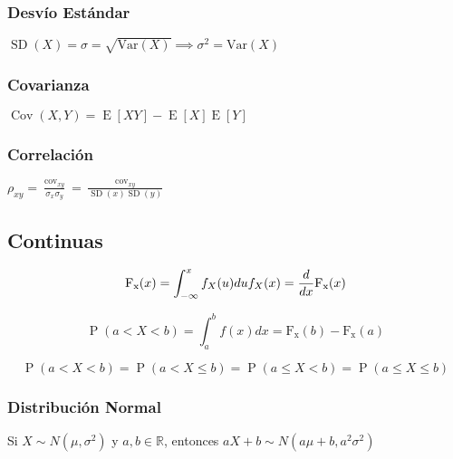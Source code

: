 \documentclass[
]{article}
\begin{document}
\hypertarget{desvuxedo-estuxe1ndar}{%
\subsubsection{Desvío Estándar}\label{desvuxedo-estuxe1ndar}}

\({\operatorname{SD}(X) = \sigma ={\sqrt {{\text{Var}}(X)}}} \implies{\sigma ^{2}={\text{Var}}(X)}\)

\hypertarget{covarianza}{%
\subsubsection{Covarianza}\label{covarianza}}

\({\operatorname {Cov} (X,Y)=\operatorname {E} \left[XY\right]-\operatorname {E} \left[X\right]\operatorname {E} \left[Y\right]}\)

\hypertarget{correlaciuxf3n}{%
\subsubsection{Correlación}\label{correlaciuxf3n}}

\(\rho_{xy} = {\frac{\operatorname{cov}_{xy}}{\sigma_x\sigma_y}} = {\frac{\operatorname{cov}_{xy}}{\operatorname{SD}(x)\operatorname{SD}(y)}}\)

\hypertarget{continuas}{%
\subsection{Continuas}\label{continuas}}

\[
{\operatorname{F_x}(x) = \int_{-\infty}^{x}{f_X(u)du}} \\
f_X(x) = \frac{d}{dx}{\operatorname{F_x}(x)} \\
\]

\[{\operatorname{P}(a < X < b) = \int_a^b{f(x)dx} = \operatorname{F_x}(b) -\operatorname{F_x}(a)} \]

\[{\operatorname{P}(a < X < b) = \operatorname{P}(a < X \leq b) = \operatorname{P}(a \leq X < b)= \operatorname{P}(a \leq X \leq b)}\]

\hypertarget{distribuciuxf3n-normal}{%
\subsubsection{Distribución Normal}\label{distribuciuxf3n-normal}}

Si \({X\sim N(\mu ,\sigma ^{2})}\) y \({a,b\in \mathbb {R} }\), entonces
\({aX+b\sim N(a\mu +b,a^{2}\sigma ^{2})}\)
\end{document}

